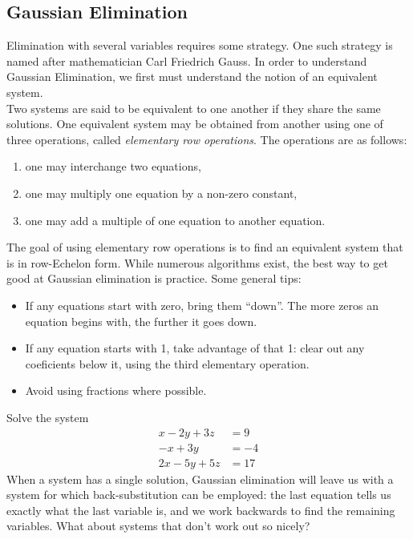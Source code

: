 \documentclass[12pt,fleqn]{book}
\begin{document}
\subsection*{Gaussian Elimination}
Elimination with several variables requires some strategy.  One such strategy is named after mathematician Carl Friedrich Gauss.  In order to understand Gaussian Elimination, we first must understand the notion of an equivalent system.
\\[1em]
Two systems are said to be equivalent to one another if they share the same solutions.  One equivalent system may be obtained from another using one of three operations, called \emph{elementary row operations}.  The operations are as follows:
\begin{enumerate}
	\item one may interchange two equations,
	\item one may multiply one equation by a non-zero constant,
	\item one may add a multiple of one equation to another equation.
\end{enumerate}
The goal of using elementary row operations is to find an equivalent system that is in row-Echelon form.  While numerous algorithms exist, the best way to get good at Gaussian elimination is practice.  Some general tips:
\begin{itemize}
	\item If any equations start with zero, bring them ``down''.  The more zeros an equation begins with, the further it goes down.
	\item If any equation starts with 1, take advantage of that 1: clear out any coeficients below it, using the third elementary operation.
	\item Avoid using fractions where possible.
\end{itemize}
Solve the system
\begin{align*}
	x-2y+3z&=9\\
	-x+3y &=-4\\
	2x-5y+5z&=17
\end{align*}
\vfill
When a system has a single solution, Gaussian elimination will leave us with a system for which back-substitution can be employed: the last equation tells us exactly what the last variable is, and we work backwards to find the remaining variables.  What about systems that don't work out so nicely?
\clearpage
\end{document}

